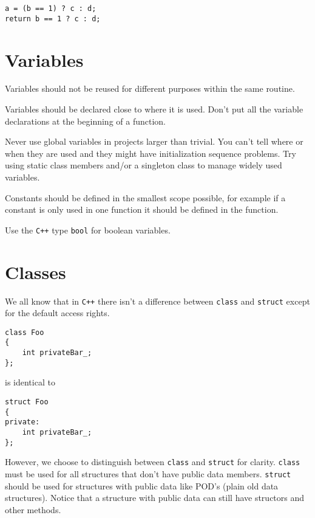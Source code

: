 \documentclass[10pt,a4paper,titlepage,dutch]{report}
\begin{document}
\verb|a = (b == 1) ? c : d;|\\
\verb|return b == 1 ? c : d;|\\

\section{Variables}

Variables should not be reused for different purposes within the
same routine.

Variables should be declared close to where it is used. Don't put
all the variable declarations at the beginning of a function.

Never use global variables in projects larger than trivial. You
can't tell where or when they are used and they might have
initialization sequence problems. Try using static class members
and/or a singleton class to manage widely used variables.

Constants should be defined in the smallest scope possible, for
example if a constant is only used in one function it should be
defined in the function.

Use the \verb|C++| type \verb|bool| for boolean variables.

\section{Classes}

We all know that in \verb|C++| there isn't a difference between
\verb|class| and \verb|struct| except for the default access
rights.

\verb|class Foo|\\
\verb|{|\\
\verb|    int privateBar_;|\\
\verb|};|

is identical to

\verb|struct Foo|\\
\verb|{|\\
\verb|private:|\\
\verb|    int privateBar_;|\\
\verb|};|

However, we choose to distinguish between \verb|class| and
\verb|struct| for clarity.  \verb|class| must be used for all
structures that don't have public data members.  \verb|struct|
should be used for structures with public data like POD's (plain
old data structures).  Notice that a structure with public data
can still have structors and other methods.
\end{document}
